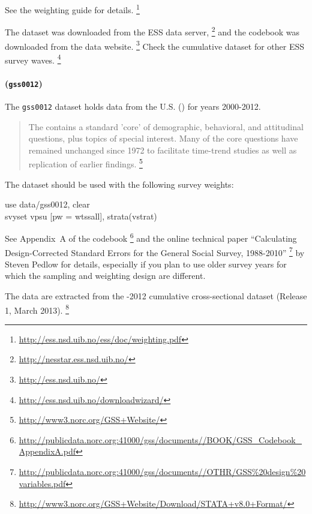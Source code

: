 See the \ESS weighting guide for details.%
  \footnote{\url{http://ess.nsd.uib.no/ess/doc/weighting.pdf}}

The dataset was downloaded from the ESS data server,%
  \footnote{\url{http://nesstar.ess.nsd.uib.no/}} %
  and the codebook was downloaded from the \ESS data website.%
  \footnote{\url{http://ess.nsd.uib.no/}} %
  Check the cumulative dataset for other ESS survey waves.%
  \footnote{\url{http://ess.nsd.uib.no/downloadwizard/}}

\paragraph{\gss (\texttt{gss0012})}

The \texttt{gss0012} dataset holds data from the U.S. \gss (\GSS) for years 2000-2012.

\begin{quote}
	The \GSS contains a standard 'core' of demographic, behavioral, and attitudinal questions, plus topics of special interest. Many of the core questions have remained unchanged since 1972 to facilitate time-trend studies as well as replication of earlier findings.%
	\footnote{\url{http://www3.norc.org/GSS+Website/}}
\end{quote}

The \GSS dataset should be used with the following survey weights:

\begin{docspec}
	use data/gss0012, clear\\
	svyset vpsu [pw = wtssall], strata(vstrat)
\end{docspec}


See Appendix~A of the \GSS codebook%
   \footnote{\url{http://publicdata.norc.org:41000/gss/documents//BOOK/GSS_Codebook_AppendixA.pdf}} %
   and the online technical paper ``Calculating Design-Corrected Standard Errors for the General Social Survey, 1988-2010''%
  \footnote{\url{http://publicdata.norc.org:41000/gss/documents//OTHR/GSS\%20design\%20variables.pdf}} %
   by Steven Pedlow for details, especially if you plan to use older survey years for which the sampling and weighting design are different.%

The data are extracted from the -2012 cumulative cross-sectional dataset (Release 1, March 2013).%
  \footnote{\url{http://www3.norc.org/GSS+Website/Download/STATA+v8.0+Format/}}

